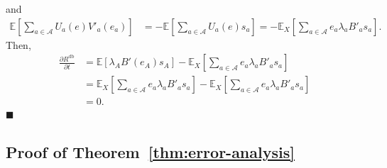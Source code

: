 and 
\begin{align}
    \mathbb{E}\left[ \sum_{a \in \mathcal{A}}U_a(e)V'_a(e_a) \right] &= - \mathbb{E}\left[ \sum_{a \in \mathcal{A}}U_a(e)s_a \right] = - \mathbb{E}_{X}\left[ \sum_{a \in \mathcal{A}}e_a\lambda_a B'_a s_a \right]. 
\end{align}
Then, 
\begin{align}
    \frac{\partial R^{\mathrm{db}}}{\partial t} &= \mathbb{E}[\lambda_A B'(e_A)s_A] - \mathbb{E}_{X}\left[ \sum_{a \in \mathcal{A}}e_a\lambda_a B'_a s_a \right] \\ 
    &= \mathbb{E}_X\left[\sum_{a \in \mathcal{A}}e_a\lambda_a B'_a s_a\right] - \mathbb{E}_{X}\left[ \sum_{a \in \mathcal{A}}e_a\lambda_a B'_a s_a \right] \\ 
    &= 0. 
\end{align}
\hfill $\blacksquare$






\subsection*{Proof of Theorem~\ref{thm:error-analysis}}

